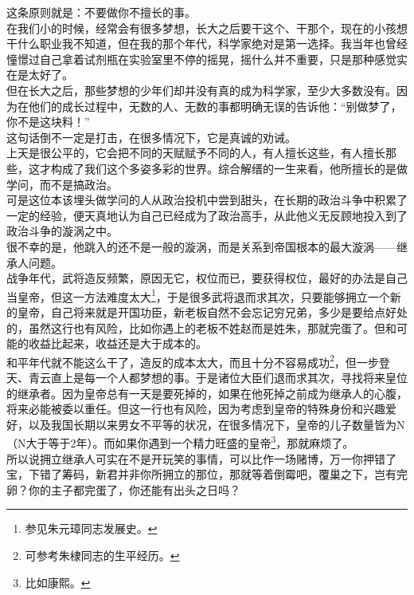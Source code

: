 \begin{multicols}{\theparacolNo}
这条原则就是：不要做你不擅长的事。\\

在我们小的时候，经常会有很多梦想，长大之后要干这个、干那个，现在的小孩想干什么职业我不知道，但在我的那个年代，科学家绝对是第一选择。我当年也曾经憧憬过自己拿着试剂瓶在实验室里不停的摇晃，摇什么并不重要，只是那种感觉实在是太好了。\\

但在长大之后，那些梦想的少年们却并没有真的成为科学家，至少大多数没有。因为在他们的成长过程中，无数的人、无数的事都明确无误的告诉他：“别做梦了，你不是这块料！”\\

这句话倒不一定是打击，在很多情况下，它是真诚的劝诫。\\

上天是很公平的，它会把不同的天赋赋予不同的人，有人擅长这些，有人擅长那些，这才构成了我们这个多姿多彩的世界。综合解缙的一生来看，他所擅长的是做学问，而不是搞政治。\\

可是这位本该埋头做学问的人从政治投机中尝到甜头，在长期的政治斗争中积累了一定的经验，便天真地认为自己已经成为了政治高手，从此他义无反顾地投入到了政治斗争的漩涡之中。\\

很不幸的是，他跳入的还不是一般的漩涡，而是关系到帝国根本的最大漩涡——继承人问题。\\

战争年代，武将造反频繁，原因无它，权位而已，要获得权位，最好的办法是自己当皇帝，但这一方法难度太大\footnote{参见朱元璋同志发展史。}，于是很多武将退而求其次，只要能够拥立一个新的皇帝，自己将来就是开国功臣，新老板自然不会忘记穷兄弟，多少是要给点好处的，虽然这行也有风险，比如你遇上的老板不姓赵而是姓朱，那就完蛋了。但和可能的收益比起来，收益还是大于成本的。\\

和平年代就不能这么干了，造反的成本太大，而且十分不容易成功\footnote{可参考朱棣同志的生平经历。}，但一步登天、青云直上是每一个人都梦想的事。于是诸位大臣们退而求其次，寻找将来皇位的继承者。因为皇帝总有一天是要死掉的，如果在他死掉之前成为继承人的心腹，将来必能被委以重任。但这一行也有风险，因为考虑到皇帝的特殊身份和兴趣爱好，以及我国长期以来男女不平等的状况，在很多情况下，皇帝的儿子数量皆为N（N大于等于2年）。而如果你遇到一个精力旺盛的皇帝\footnote{比如康熙。}，那就麻烦了。\\

所以说拥立继承人可实在不是开玩笑的事情，可以比作一场赌博，万一你押错了宝，下错了筹码，新君并非你所拥立的那位，那就等着倒霉吧，覆巢之下，岂有完卵？你的主子都完蛋了，你还能有出头之日吗？\\


\end{multicols}
